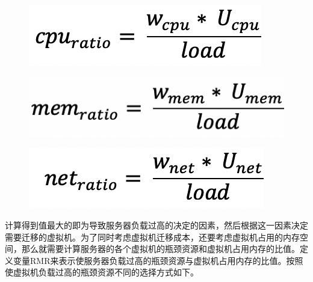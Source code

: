  \begin{figure}[htbp]
  \centering
  \includegraphics[width=0.6\linewidth]{./Figure/IMG_Chap3_9.png}
\end{figure}

 \begin{figure}[htbp]
  \centering
  \includegraphics[width=0.6\linewidth]{./Figure/IMG_Chap3_10.png}
\end{figure}

 \begin{figure}[htbp]
  \centering
  \includegraphics[width=0.6\linewidth]{./Figure/IMG_Chap3_11.png}
\end{figure}

计算得到值最大的即为导致服务器负载过高的决定的因素，然后根据这一因素决定需要迁移的虚拟机。为了同时考虑虚拟机迁移成本，还要考虑虚拟机占用的内存空间，那么就需要计算服务器的各个虚拟机的瓶颈资源和虚拟机占用内存的比值。定义变量RMR来表示使服务器负载过高的瓶颈资源与虚拟机占用内存的比值。按照使虚拟机负载过高的瓶颈资源不同的选择方式如下。

